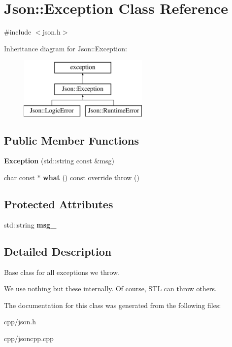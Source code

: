\hypertarget{class_json_1_1_exception}{}\section{Json\+:\+:Exception Class Reference}
\label{class_json_1_1_exception}


{\ttfamily \#include $<$json.\+h$>$}

Inheritance diagram for Json\+:\+:Exception\+:\begin{figure}[H]
\begin{center}
\leavevmode
\includegraphics[height=3.000000cm]{class_json_1_1_exception}
\end{center}
\end{figure}
\subsection*{Public Member Functions}
\begin{DoxyCompactItemize}
\item 
\mbox{\label{class_json_1_1_exception_a4dd1b9f007bed842e3ef9883d965fe22}} 
{\bfseries Exception} (std\+::string const \&msg)
\item 
\mbox{\label{class_json_1_1_exception_a6b519dfbee6c391c7f3b55c2ea316b9e}} 
char const  $\ast$ {\bfseries what} () const override  throw ()
\end{DoxyCompactItemize}
\subsection*{Protected Attributes}
\begin{DoxyCompactItemize}
\item 
\mbox{\label{class_json_1_1_exception_a26b7dfcd51256ad4da2742bbd0e14a24}} 
std\+::string {\bfseries msg\+\_\+}
\end{DoxyCompactItemize}


\subsection{Detailed Description}
Base class for all exceptions we throw.

We use nothing but these internally. Of course, S\+TL can throw others. 

The documentation for this class was generated from the following files\+:\begin{DoxyCompactItemize}
\item 
cpp/json.\+h\item 
cpp/jsoncpp.\+cpp\end{DoxyCompactItemize}
